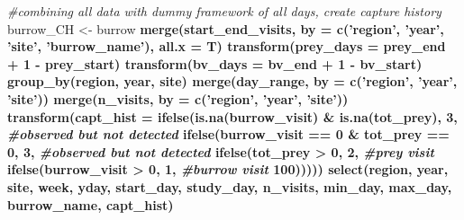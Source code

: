 \documentclass[]{article}
\newenvironment{Shaded}{\begin{snugshade}}{\end{snugshade}}
\newcommand{\KeywordTok}[1]{\textcolor[rgb]{0.13,0.29,0.53}{\textbf{#1}}}
\newcommand{\DataTypeTok}[1]{\textcolor[rgb]{0.13,0.29,0.53}{#1}}
\newcommand{\DecValTok}[1]{\textcolor[rgb]{0.00,0.00,0.81}{#1}}
\newcommand{\StringTok}[1]{\textcolor[rgb]{0.31,0.60,0.02}{#1}}
\newcommand{\CommentTok}[1]{\textcolor[rgb]{0.56,0.35,0.01}{\textit{#1}}}
\newcommand{\OperatorTok}[1]{\textcolor[rgb]{0.81,0.36,0.00}{\textbf{#1}}}
\newcommand{\NormalTok}[1]{#1}
\begin{document}
\begin{Shaded}
\begin{Highlighting}[]
{{{{{{{{{{{{{{{{{{{{{{{{{{{{{{{{{{\CommentTok{#combining all data with dummy framework of all days, create capture history}
\NormalTok{burrow_CH <-}\StringTok{ }\NormalTok{burrow }\OperatorTok{%>%}
\StringTok{  }\KeywordTok{merge}\NormalTok{(start_end_visits, }\DataTypeTok{by =} \KeywordTok{c}\NormalTok{(}\StringTok{'region'}\NormalTok{, }\StringTok{'year'}\NormalTok{, }\StringTok{'site'}\NormalTok{, }\StringTok{'burrow_name'}\NormalTok{), }\DataTypeTok{all.x =}\NormalTok{ T) }\OperatorTok{%>%}
\StringTok{  }\KeywordTok{transform}\NormalTok{(}\DataTypeTok{prey_days =}\NormalTok{ prey_end }\OperatorTok{+}\StringTok{ }\DecValTok{1} \OperatorTok{-}\StringTok{ }\NormalTok{prey_start) }\OperatorTok{%>%}
\StringTok{  }\KeywordTok{transform}\NormalTok{(}\DataTypeTok{bv_days =}\NormalTok{ bv_end }\OperatorTok{+}\StringTok{ }\DecValTok{1} \OperatorTok{-}\StringTok{ }\NormalTok{bv_start) }\OperatorTok{%>%}
\StringTok{  }\KeywordTok{group_by}\NormalTok{(region, year, site) }\OperatorTok{%>%}
\StringTok{  }\KeywordTok{merge}\NormalTok{(day_range, }\DataTypeTok{by =} \KeywordTok{c}\NormalTok{(}\StringTok{'region'}\NormalTok{, }\StringTok{'year'}\NormalTok{, }\StringTok{'site'}\NormalTok{)) }\OperatorTok{%>%}
\StringTok{  }\KeywordTok{merge}\NormalTok{(n_visits, }\DataTypeTok{by =} \KeywordTok{c}\NormalTok{(}\StringTok{'region'}\NormalTok{, }\StringTok{'year'}\NormalTok{, }\StringTok{'site'}\NormalTok{)) }\OperatorTok{%>%}\StringTok{ }\CommentTok{#arrange(burrow_name)}
\StringTok{  }\KeywordTok{transform}\NormalTok{(}\DataTypeTok{capt_hist =} \KeywordTok{ifelse}\NormalTok{(}\KeywordTok{is.na}\NormalTok{(burrow_visit) }\OperatorTok{&}\StringTok{ }\KeywordTok{is.na}\NormalTok{(tot_prey), }\DecValTok{3}\NormalTok{, }\CommentTok{#observed but not detected}
                     \KeywordTok{ifelse}\NormalTok{(burrow_visit }\OperatorTok{==}\StringTok{ }\DecValTok{0} \OperatorTok{&}\StringTok{ }\NormalTok{tot_prey }\OperatorTok{==}\StringTok{ }\DecValTok{0}\NormalTok{, }\DecValTok{3}\NormalTok{, }\CommentTok{#observed but not detected}
              \KeywordTok{ifelse}\NormalTok{(tot_prey }\OperatorTok{>}\StringTok{ }\DecValTok{0}\NormalTok{, }\DecValTok{2}\NormalTok{, }\CommentTok{#prey visit}
              \KeywordTok{ifelse}\NormalTok{(burrow_visit }\OperatorTok{>}\StringTok{ }\DecValTok{0}\NormalTok{, }\DecValTok{1}\NormalTok{, }\CommentTok{#burrow visit}
                       \DecValTok{100}\NormalTok{))))) }\OperatorTok{%>%}\StringTok{ }
\StringTok{  }\KeywordTok{select}\NormalTok{(region, year, site, week, yday, start_day, study_day, n_visits, }
\NormalTok{         min_day, max_day, burrow_name, capt_hist) }\OperatorTok{%>%}\StringTok{ }\KeywordTok{distinct}\NormalTok{() }\OperatorTok{%>%}
}}}}}}}}}}}}}}}}}}}}}}}}}}}}}}}}}}}}}}}}}}}
\end{Highlighting}
\end{Shaded}
\end{document}
